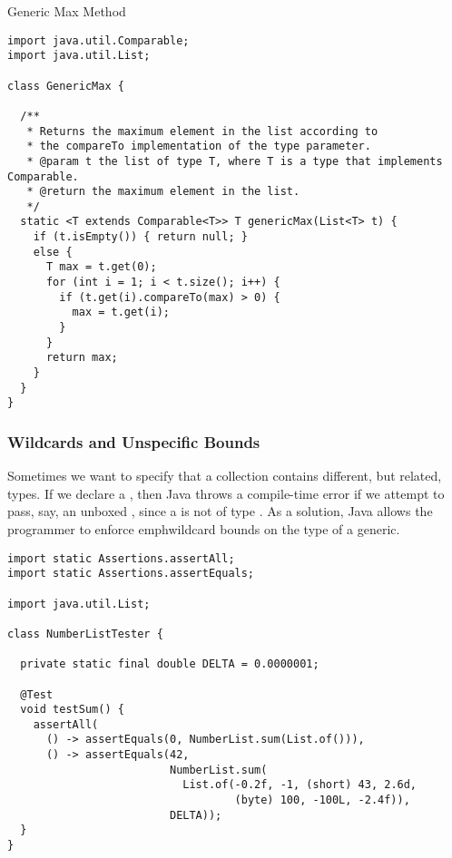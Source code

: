 \begin{cl}[]{Generic Max Method}
\begin{lstlisting}[language=MyJava]
import java.util.Comparable;
import java.util.List;

class GenericMax {
  
  /**
   * Returns the maximum element in the list according to 
   * the compareTo implementation of the type parameter.
   * @param t the list of type T, where T is a type that implements Comparable.
   * @return the maximum element in the list.
   */
  static <T extends Comparable<T>> T genericMax(List<T> t) {
    if (t.isEmpty()) { return null; }
    else {
      T max = t.get(0);
      for (int i = 1; i < t.size(); i++) {
        if (t.get(i).compareTo(max) > 0) { 
          max = t.get(i); 
        }
      }
      return max;
    }
  }
}
\end{lstlisting}
\end{cl}

\subsubsection*{Wildcards and Unspecific Bounds}
Sometimes we want to specify that a collection contains different, but related, types. If we declare a , then Java throws a compile-time error if we attempt to pass, say, an unboxed , since a  is not of type . As a solution, Java allows the programmer to enforce emph{wildcard} bounds on the type of a generic. 


\begin{cl}[]{}
\begin{lstlisting}[language=MyJava]
import static Assertions.assertAll;
import static Assertions.assertEquals;

import java.util.List;

class NumberListTester {

  private static final double DELTA = 0.0000001;

  @Test
  void testSum() {
    assertAll(
      () -> assertEquals(0, NumberList.sum(List.of())),
      () -> assertEquals(42, 
                         NumberList.sum(
                           List.of(-0.2f, -1, (short) 43, 2.6d, 
                                   (byte) 100, -100L, -2.4f)),
                         DELTA));
  }
}
\end{lstlisting}
\end{cl}

